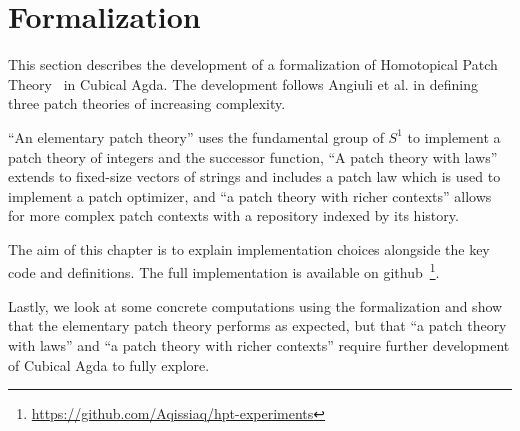 \chapter{Formalization}\label{ch/formalization}

This section describes the development of a formalization of Homotopical Patch
Theory~\cite{Angiuli2016} in Cubical Agda. The development follows Angiuli et
al. in defining three patch theories of increasing complexity.

``An elementary patch theory'' uses the fundamental group of $S^1$ to implement
a patch theory of integers and the successor function, ``A patch theory with
laws'' extends to fixed-size vectors of strings and includes a patch law which
is used to implement a patch optimizer, and ``a patch theory with richer
contexts'' allows for more complex patch contexts with a repository indexed by
its history.

The aim of this chapter is to explain implementation choices alongside the key
code and definitions. The full implementation is available on
github~\footnote{\url{https://github.com/Aqissiaq/hpt-experiments}}.

Lastly, we look at some concrete computations using the formalization and
show that the elementary patch theory performs as expected, but that ``a
patch theory with laws'' and ``a patch theory with richer contexts''
require further development of Cubical Agda to fully explore.